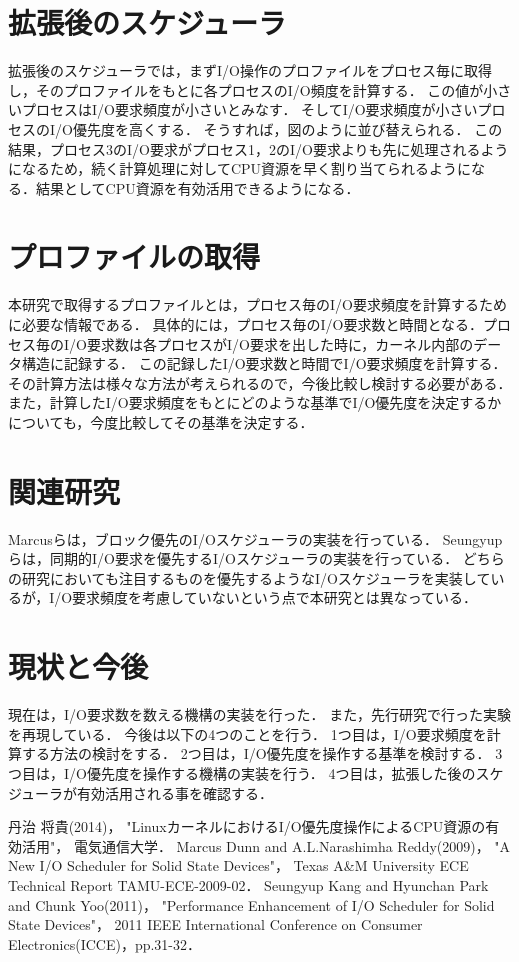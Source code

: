 \documentclass[]{iplresume} %
\begin{document}
\section{拡張後のスケジューラ}
拡張後のスケジューラでは，まずI/O操作のプロファイルをプロセス毎に取得し，そのプロファイルをもとに各プロセスのI/O頻度を計算する．
この値が小さいプロセスはI/O要求頻度が小さいとみなす．
そしてI/O要求頻度が小さいプロセスのI/O優先度を高くする．
そうすれば，図のように並び替えられる．
この結果，プロセス3のI/O要求がプロセス1，2のI/O要求よりも先に処理されるようになるため，続く計算処理に対してCPU資源を早く割り当てられるようになる．結果としてCPU資源を有効活用できるようになる．
\section{プロファイルの取得}
本研究で取得するプロファイルとは，プロセス毎のI/O要求頻度を計算するために必要な情報である．
具体的には，プロセス毎のI/O要求数と時間となる．プロセス毎のI/O要求数は各プロセスがI/O要求を出した時に，カーネル内部のデータ構造に記録する．
この記録したI/O要求数と時間でI/O要求頻度を計算する．
その計算方法は様々な方法が考えられるので，今後比較し検討する必要がある．
また，計算したI/O要求頻度をもとにどのような基準でI/O優先度を決定するかについても，今度比較してその基準を決定する．
\section{関連研究}
Marcusら\cite{marcus}は，ブロック優先のI/Oスケジューラの実装を行っている．
Seungyupら\cite{seungyup}は，同期的I/O要求を優先するI/Oスケジューラの実装を行っている．
どちらの研究においても注目するものを優先するようなI/Oスケジューラを実装しているが，I/O要求頻度を考慮していないという点で本研究とは異なっている．
\section{現状と今後}
現在は，I/O要求数を数える機構の実装を行った．
また，先行研究\cite{tanji}で行った実験を再現している．
今後は以下の4つのことを行う．
1つ目は，I/O要求頻度を計算する方法の検討をする．
2つ目は，I/O優先度を操作する基準を検討する．
3つ目は，I/O優先度を操作する機構の実装を行う．
4つ目は，拡張した後のスケジューラが有効活用される事を確認する．
\begin{thebibliography}{9}
   丹治 将貴(2014)，
    "LinuxカーネルにおけるI/O優先度操作によるCPU資源の有効活用"，
    電気通信大学．
   Marcus Dunn and A.L.Narashimha Reddy(2009)，
    "A New I/O Scheduler for Solid State Devices"，
    Texas A\&M University ECE Technical Report TAMU-ECE-2009-02．
   Seungyup Kang and Hyunchan Park and Chunk Yoo(2011)，
    "Performance Enhancement of I/O Scheduler for Solid State Devices"，
    2011 IEEE International Conference on Consumer Electronics(ICCE)，pp.31-32．
\end{thebibliography}
\end{document}
